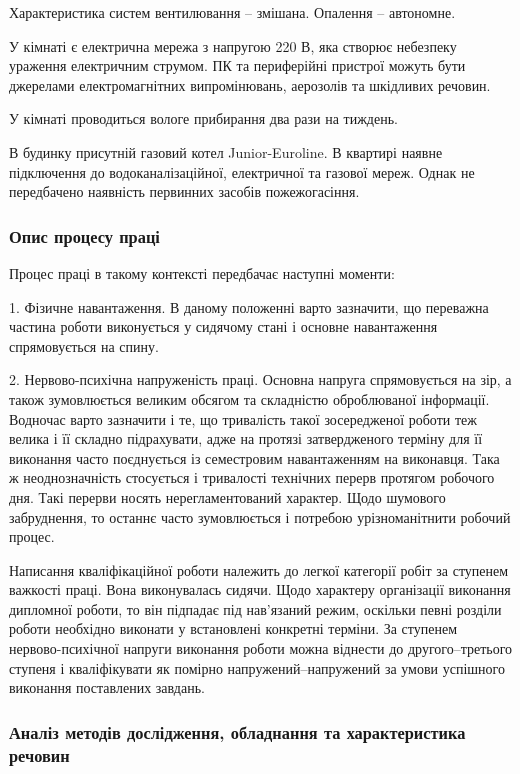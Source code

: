Характеристика систем вентилювання – змішана. Опалення – автономне.

У кімнаті є електрична мережа з напругою 220 В, яка створює небезпеку ураження електричним струмом. ПК та периферійні пристрої можуть бути джерелами електромагнітних  випромінювань, аерозолів та шкідливих речовин.

У кімнаті проводиться вологе прибирання два рази на тиждень.

В будинку присутній газовий котел Junior-Euroline. В квартирі наявне підключення до водоканалізаційної, електричної та газової мереж. Однак не передбачено наявність первинних засобів пожежогасіння.


\subsubsection{Опис процесу праці}

Процес праці в такому контексті передбачає наступні моменти:

1. Фізичне навантаження. В даному положенні варто зазначити, що переважна частина роботи виконується у сидячому стані і основне навантаження спрямовується на спину.

2. Нервово-психічна напруженість праці. Основна напруга спрямовується на зір, а також зумовлюється великим обсягом та складністю оброблюваної інформації. Водночас варто зазначити і те, що тривалість такої зосередженої роботи теж велика і її складно підрахувати, адже на протязі затвердженого терміну для її виконання часто поєднується із семестровим навантаженням на виконавця. Така ж неоднозначність стосується і тривалості технічних перерв протягом робочого дня. Такі перерви носять нерегламентований характер. Щодо шумового забруднення, то останнє часто зумовлюється і потребою урізноманітнити робочий процес.

Написання кваліфікаційної роботи належить до легкої категорії робіт за ступенем важкості праці. Вона виконувалась сидячи. Щодо характеру організації виконання дипломної роботи, то він підпадає під нав’язаний режим, оскільки певні розділи роботи необхідно виконати у встановлені конкретні терміни. За ступенем нервово-психічної напруги виконання роботи можна віднести до другого–третього ступеня і кваліфікувати як помірно напружений–напружений за умови успішного виконання поставлених завдань.

\subsubsection{Аналіз методів дослідження, обладнання та характеристика речовин}

